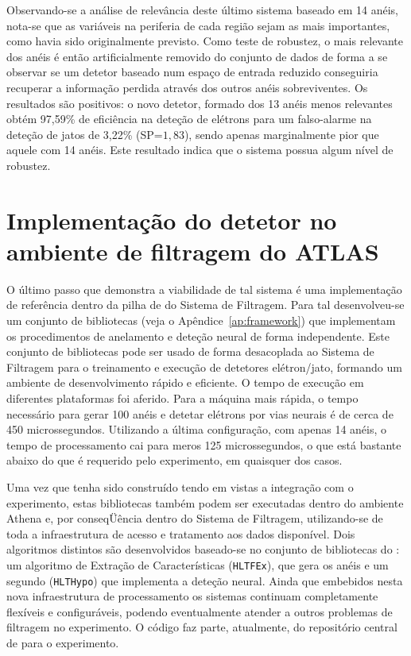 Observando-se a análise de relevância deste último sistema baseado em 14
anéis, nota-se que as variáveis na periferia de cada região sejam as mais
importantes, como havia sido originalmente previsto. Como teste de robustez, o
mais relevante dos anéis é então artificialmente removido do conjunto de dados
de forma a se observar se um detetor baseado num espaço de entrada reduzido
conseguiria recuperar a informação perdida através dos outros anéis
sobreviventes. Os resultados são positivos: o novo detetor, formado dos 13
anéis menos relevantes obtém 97,59\% de eficiência na deteção de elétrons para
um falso-alarme na deteção de jatos de 3,22\% (SP=$1,83$), sendo apenas
marginalmente pior que aquele com 14 anéis. Este resultado indica que o
sistema possua algum nível de robustez.

\section{Implementação do detetor no ambiente de filtragem do ATLAS}

O último passo que demonstra a viabilidade de tal sistema é uma implementação
de referência dentro da pilha de  do Sistema de Filtragem. Para
tal desenvolveu-se um conjunto de bibliotecas (veja o
Apêndice~\ref{ap:framework}) que implementam os procedimentos de anelamento e
deteção neural de forma independente. Este conjunto de bibliotecas pode ser
usado de forma desacoplada ao Sistema de Filtragem para o treinamento e
execução de detetores elétron/jato, formando um ambiente de desenvolvimento
rápido e eficiente. O tempo de execução em diferentes plataformas foi
aferido. Para a máquina mais rápida, o tempo necessário para gerar 100 anéis e
detetar elétrons por vias neurais é de cerca de 450 microssegundos. Utilizando
a última configuração, com apenas 14 anéis, o tempo de processamento cai para
meros 125 microssegundos, o que está bastante abaixo do que é requerido pelo
experimento, em quaisquer dos casos.

Uma vez que tenha sido construído tendo em vistas a integração com o
experimento, estas bibliotecas também podem ser executadas dentro do ambiente
Athena e, por conseqÜência dentro do Sistema de Filtragem, utilizando-se de
toda a infraestrutura de acesso e tratamento aos dados disponível. Dois
algoritmos distintos são desenvolvidos baseado-se no conjunto de bibliotecas
do : um algoritmo de Extração de Características
(\texttt{HLTFEx}), que gera os anéis e um segundo (\texttt{HLTHypo}) que
implementa a deteção neural. Ainda que embebidos nesta nova infraestrutura de
processamento os sistemas continuam completamente flexíveis e configuráveis,
podendo eventualmente atender a outros problemas de filtragem no
experimento. O código faz parte, atualmente, do repositório central de
 para o experimento.

